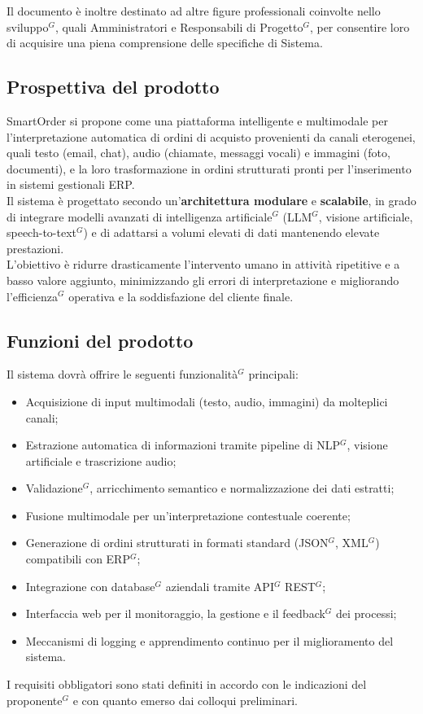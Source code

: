     Il documento è inoltre destinato ad altre figure professionali coinvolte nello sviluppo$^G$, quali Amministratori e Responsabili di Progetto$^G$, per consentire loro di acquisire una piena comprensione delle specifiche di Sistema.

	\subsection{Prospettiva del prodotto}
	SmartOrder si propone come una piattaforma intelligente e multimodale per l'interpretazione automatica di ordini di acquisto provenienti da canali eterogenei, quali testo (email, chat), audio (chiamate, messaggi vocali) e immagini (foto, documenti), e la loro trasformazione in ordini strutturati pronti per l'inserimento in sistemi gestionali ERP.\\
    Il sistema è progettato secondo un'\textbf{architettura modulare} e \textbf{scalabile}, in grado di integrare modelli avanzati di intelligenza artificiale$^G$ (LLM$^G$, visione artificiale, speech-to-text$^G$) e di adattarsi a volumi elevati di dati mantenendo elevate prestazioni.\\
	L'obiettivo è ridurre drasticamente l'intervento umano in attività ripetitive e a basso valore aggiunto, minimizzando gli errori di interpretazione e migliorando l'efficienza$^G$ operativa e la soddisfazione del cliente finale.
	
	\subsection{Funzioni del prodotto}
	Il sistema dovrà offrire le seguenti funzionalità$^G$ principali:
	\begin{itemize}
	    \item Acquisizione di input multimodali (testo, audio, immagini) da molteplici canali;
	    \item Estrazione automatica di informazioni tramite pipeline di NLP$^G$, visione artificiale e trascrizione audio;
	    \item Validazione$^G$, arricchimento semantico e normalizzazione dei dati estratti;
	    \item Fusione multimodale per un'interpretazione contestuale coerente;
	    \item Generazione di ordini strutturati in formati standard (JSON$^G$, XML$^G$) compatibili con ERP$^G$;
	    \item Integrazione con database$^G$ aziendali tramite API$^G$ REST$^G$;
	    \item Interfaccia web per il monitoraggio, la gestione e il feedback$^G$ dei processi;
	    \item Meccanismi di logging e apprendimento continuo per il miglioramento del sistema.
	\end{itemize}
	I requisiti obbligatori sono stati definiti in accordo con le indicazioni del proponente$^G$ e con quanto emerso dai colloqui preliminari.

